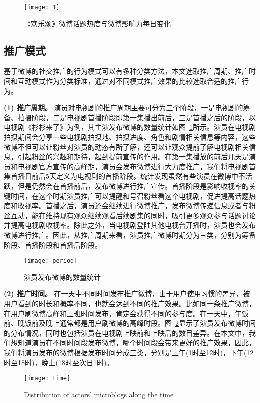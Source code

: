 \begin{figure}[!htbp]
\centering
\texttt{[image: 1]}
\caption{《欢乐颂》微博话题热度与微博影响力每日变化}
\end{figure}

\subsection{推广模式}

基于微博的社交推广的行为模式可以有多种分类方法，本文选取推广周期、推广时间和互动模式作为分类标准，通过对不同模式推广效果的比较选取合适的推广行为。

\textbf{(1) 推广周期。}
演员对电视剧的推广周期主要可分为三个阶段，一是电视剧的筹备、拍摄阶段，二是电视剧首播阶段即第一集播出前后，三是首播之后的阶段，以电视剧《杉杉来了》为例，其主演发布微博的数量统计如图~\ref{shan}所示。演员在电视剧拍摄期间会分享一些电视剧拍摄地、拍摄进度、角色和剧情相关信息等内容，这些微博不但可以让粉丝对演员的动态有所了解，还可以让观众提前了解电视剧相关信息，引起粉丝的兴趣和期待，起到提前宣传的作用。在第一集播放的前后几天是演员和电视剧官方宣传的高峰期，演员会发布微博进行大力度推广，我们将电视剧首集首播日前后5天定义为电视剧的首播阶段。统计发现虽然有些演员在微博中不活跃，但是仍然会在首播前后，发布微博进行推广宣传。首播阶段是影响收视率的关键时间，在这个时期演员推广可以提醒和号召粉丝看这个电视剧，促进提高话题热度和收视率。首播之后，演员还会继续进行微博推广，发布微博传递信息或者与粉丝互动，能在维持现有观众继续观看后续剧集的同时，吸引更多观众参与话题讨论并提高电视剧收视率。除此之外，当电视剧登陆其他电视台开播时，演员也会发布微博进行推广。因此，从推广周期来看，演员推广微博时期分为三类，分别为筹备阶段、首播阶段和首播后阶段。

\begin{figure}[!htp]
\centering
\texttt{[image: period]}
\caption{演员发布微博的数量统计}
\label{shan}
\end{figure}

\textbf{(2) 推广时间。}
在一天中不同时间发布推广微博，由于用户使用习惯的差异，被用户看到的时长和概率不同，也就会达到不同的推广效果。比如同一条推广微博，在用户刷微博高峰和上班时间发布，肯定会获得不同的参与度。在一天中，午饭前、晚饭前及晚上通常都是用户刷微博的高峰时段。图~\ref{time}显示了演员发布微博时间的分布情况，同时也包括演员在电视剧上映前和上映后的数目差异。在本文中，我们想知道演员在不同时间段发布微博，哪个时间段会带来更好的推广效果，因此，我们将演员发布的微博根据发布时间分成三类，分别是上午(1时至12时)，下午(12时至18时)，晚上(18时至次日1时)。

\begin{figure}[!htbp]
\centering
\texttt{[image: time]}
\caption{Distribution of actors' microblogs along the time}
\label{time}
\end{figure}

